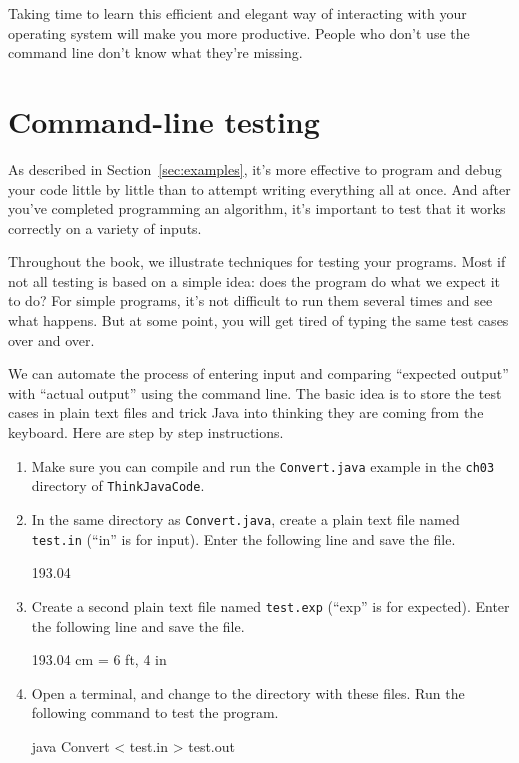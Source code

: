 \documentclass[12pt]{book}
\theoremstyle{exercise}
\begin{document}
Taking time to learn this efficient and elegant way of interacting with your operating system will make you more productive.
People who don't use the command line don't know what they're missing.


\section{Command-line testing}
\label{cltesting}

As described in Section~\ref{sec:examples}, it's more effective to program and debug your code little by little than to attempt writing everything all at once.
And after you've completed programming an algorithm, it's important to test that it works correctly on a variety of inputs.

Throughout the book, we illustrate techniques for testing your programs.
Most if not all testing is based on a simple idea: does the program do what we expect it to do?
For simple programs, it's not difficult to run them several times and see what happens.
But at some point, you will get tired of typing the same test cases over and over.

We can automate the process of entering input and comparing ``expected output'' with ``actual output'' using the command line.
The basic idea is to store the test cases in plain text files and trick Java into thinking they are coming from the keyboard.
Here are step by step instructions.

\begin{enumerate}

\item Make sure you can compile and run the {\tt Convert.java} example in the {\tt ch03} directory of {\tt ThinkJavaCode}.

\item In the same directory as {\tt Convert.java}, create a plain text file named {\tt test.in} (``in'' is for input).
Enter the following line and save the file.

\begin{stdout}
193.04
\end{stdout}

\item Create a second plain text file named {\tt test.exp} (``exp'' is for expected).
Enter the following line and save the file.

\begin{stdout}
193.04 cm = 6 ft, 4 in
\end{stdout}

\item Open a terminal, and change to the directory with these files.
Run the following command to test the program.

\begin{stdout}
java Convert < test.in > test.out
\end{stdout}

\end{enumerate}
\end{document}
